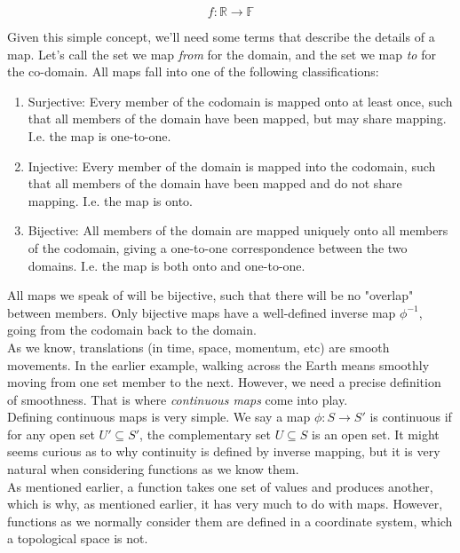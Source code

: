 \documentclass[10pt]{report}
\begin{document}
\begin{appendices}
	\begin{equation}
		f: \mathbb{R} \to \mathbb{F}
	\end{equation}
	
	Given this simple concept, we'll need some terms that describe the details of a map. Let's call the set we map \emph{from} for the domain, and the set we map \emph{to} for the co-domain. All maps fall into one of the following classifications:
	
	\begin{enumerate}
		\item Surjective: Every member of the codomain is mapped onto at least once, such that all members of the domain have been mapped, but may share mapping. I.e. the map is one-to-one.
		\item Injective: Every member of the domain is mapped into the codomain, such that all members of the domain have been mapped and do not share mapping. I.e. the map is onto.
		\item Bijective: All members of the domain are mapped uniquely onto all members of the codomain, giving a one-to-one correspondence between the two domains. I.e. the map is both onto and one-to-one.
	\end{enumerate}
	
	All maps we speak of will be bijective, such that there will be no "overlap" between members. Only bijective maps have a well-defined inverse map $\phi^{-1}$, going from the codomain back to the domain.\\
	
	As we know, translations (in time, space, momentum, etc) are smooth movements. In the earlier example, walking across the Earth means smoothly moving from one set member to the next. However, we need a precise definition of smoothness. That is where \emph{continuous maps} come into play.\\
	Defining continuous maps is very simple. We say a map $\phi: S\rightarrow S'$ is continuous if for any open set $U' \subseteq S'$, the complementary set $U\subseteq S$ is an open set. It might seems curious as to why continuity is defined by inverse mapping, but it is very natural when considering functions as we know them.\\
	As mentioned earlier, a function takes one set of values and produces another, which is why, as mentioned earlier, it has very much to do with maps. However, functions as we normally consider them are defined in a coordinate system, which a topological space is not. 
	

\end{appendices}
\end{document}
